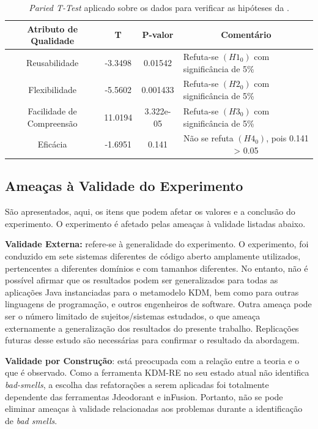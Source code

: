\begin{table}[]
\centering
\caption{\textit{Paried T-Test} aplicado sobre os dados para verificar as hipóteses da .}
\label{tab:experimento_1_10_15}
\begin{tabular}{|m{1cm}|l|l|m{7.1cm}|}
\hline
\multicolumn{1}{|c|}{Atributo de Qualidade} & \multicolumn{1}{c|}{T} & \multicolumn{1}{c|}{P-valor} & \multicolumn{1}{c|}{Comentário} \\ \hline
\multicolumn{1}{|c|}{Reusabilidade} & \multicolumn{1}{c|}{-3.3498} & \multicolumn{1}{c|}{0.01542} & Refuta-se \textbf{$(H1_{0})$} com significância de 5\%\\ \hline
\multicolumn{1}{|c|}{Flexibilidade} &\multicolumn{1}{c|}{-5.5602}& \multicolumn{1}{c|}{0.001433} &Refuta-se \textbf{$(H2_{0})$} com significância de 5\%\\ \hline
\multicolumn{1}{|c|}{Facilidade de Compreensão} & \multicolumn{1}{c|}{11.0194} &    \multicolumn{1}{c|}{3.322e-05}&Refuta-se \textbf{$(H3_{0})$} com significância de 5\%\\ \hline
\multicolumn{1}{|c|}{Eficácia}&\multicolumn{1}{c|}{-1.6951}&\multicolumn{1}{c|}{0.141}&\multicolumn{1}{c|}{Não se refuta \textbf{$(H4_{0})$}, pois 0.141 > 0.05}\\ \hline
\end{tabular}
\end{table}

\subsection{Ameaças à Validade do Experimento}
São apresentados, aqui,  os itens que podem afetar os valores e a conclusão do experimento. O experimento é afetado pelas ameaças à validade listadas abaixo.

\textbf{Validade Externa:} refere-se à generalidade do experimento. O experimento, foi conduzido em sete sistemas diferentes de código aberto amplamente utilizados, pertencentes a diferentes domínios e com tamanhos diferentes. No entanto, não é possível afirmar que os resultados podem ser generalizados para todas as aplicações Java instanciadas para o metamodelo KDM, bem como para outras linguagens de programação, e outros engenheiros de software. Outra ameaça pode ser o número limitado de sujeitos/sistemas estudados, o que ameaça externamente a generalização dos resultados do presente trabalho. Replicações futuras desse estudo são necessárias para confirmar o resultado da abordagem.


\textbf{Validade por Construção}: está preocupada com a relação entre a teoria e o que é observado. 
Como a ferramenta KDM-RE no seu estado atual não identifica \textit{bad-smells}, 
a escolha das refatorações a serem aplicadas foi totalmente dependente das ferramentas Jdeodorant e inFusion. Portanto, 
não se pode eliminar ameaças à validade relacionadas aos problemas durante a identificação de \textit{bad smells}.


